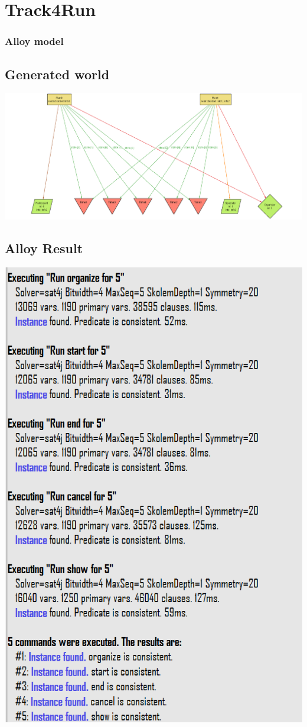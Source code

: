 \section{Track4Run}
\subsubsection{Alloy model}

\subsection{Generated world}
\includegraphics[width = \textheight, angle=90]{sections/alloy/GenWorldT4R.png}
\subsection{Alloy Result}
\includegraphics[height = \textheight]{sections/alloy/resultT4R.png}